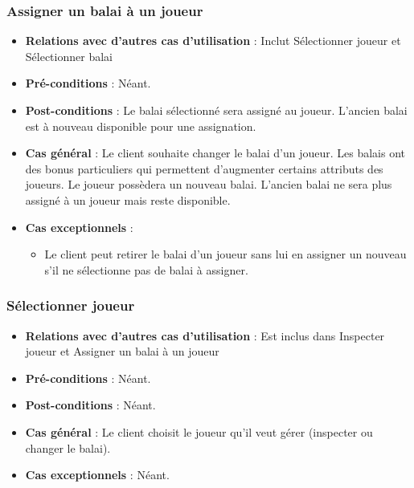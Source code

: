 \documentclass[a4paper,titlepage]{scrreprt}
\begin{document}
    \subsubsection{Assigner un balai à un joueur}
      \begin{itemize}
        \item \textbf{Relations avec d'autres cas d'utilisation}  : Inclut Sélectionner joueur et Sélectionner balai
        \item \textbf{Pré-conditions} : Néant.
        \item \textbf{Post-conditions} : Le balai sélectionné sera assigné au joueur. L’ancien balai est à nouveau disponible pour une assignation.
        \item \textbf{Cas général} : Le client souhaite changer le balai d’un joueur. Les balais ont des bonus particuliers qui permettent d’augmenter certains attributs des joueurs. Le joueur possèdera un nouveau balai. L’ancien balai ne sera plus assigné à un joueur mais reste disponible.
        \item \textbf{Cas exceptionnels} :
          \begin{itemize}
            \item Le client peut retirer le balai d’un joueur sans lui en assigner un nouveau s’il ne sélectionne pas de balai à assigner.
          \end{itemize}
      \end{itemize}
    \subsubsection{Sélectionner joueur}
      \begin{itemize}
        \item \textbf{Relations avec d'autres cas d'utilisation}  :  Est inclus dans Inspecter joueur et Assigner un balai à un joueur
        \item \textbf{Pré-conditions} : Néant.
        \item \textbf{Post-conditions} : Néant.
        \item \textbf{Cas général} : Le client choisit le joueur qu’il veut gérer (inspecter ou changer le balai).
        \item \textbf{Cas exceptionnels} : Néant.
      \end{itemize}
\end{document}
